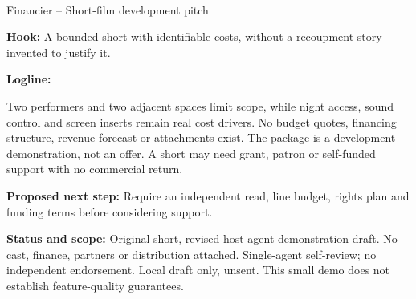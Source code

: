 \documentclass[11pt,letterpaper]{article}
\begin{document}
\begin{center}
{\Large\bfseries\sffamily \filmtitleupper}\\[6pt]
Financier -- Short-film development pitch
\end{center}
\textbf{Hook:} A bounded short with identifiable costs, without a recoupment story invented to justify it.

\textbf{Logline:} \filmlogline

Two performers and two adjacent spaces limit scope, while night access, sound control and screen inserts remain real cost drivers. No budget quotes, financing structure, revenue forecast or attachments exist. The package is a development demonstration, not an offer. A short may need grant, patron or self-funded support with no commercial return.

\textbf{Proposed next step:} Require an independent read, line budget, rights plan and funding terms before considering support.

\textbf{Status and scope:} Original short, revised host-agent demonstration draft. No cast, finance, partners or distribution attached. Single-agent self-review; no independent endorsement. Local draft only, unsent. This small demo does not establish feature-quality guarantees.
\end{document}

